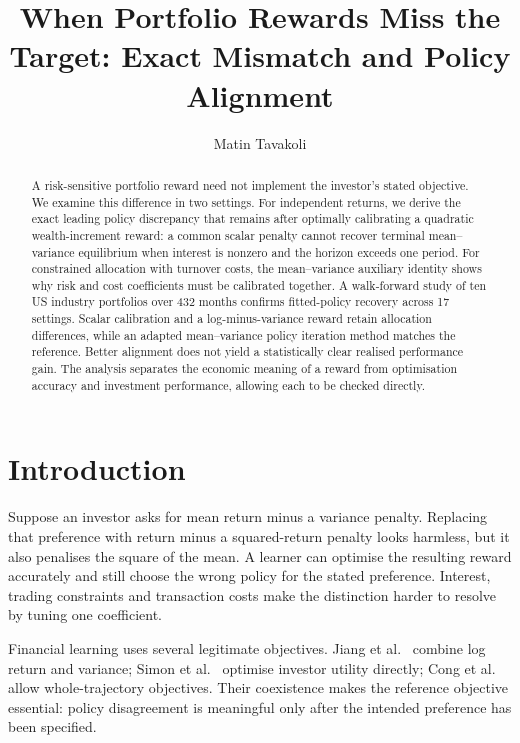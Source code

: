 \documentclass[sigconf,review]{acmart}
\title{When Portfolio Rewards Miss the Target: Exact Mismatch and Policy Alignment}
\author{Matin Tavakoli}
\begin{document}
\begin{abstract}
A risk-sensitive portfolio reward need not implement the investor's stated objective. We examine this difference in two settings. For independent returns, we derive the exact leading policy discrepancy that remains after optimally calibrating a quadratic wealth-increment reward: a common scalar penalty cannot recover terminal mean--variance equilibrium when interest is nonzero and the horizon exceeds one period. For constrained allocation with turnover costs, the mean--variance auxiliary identity shows why risk and cost coefficients must be calibrated together. A walk-forward study of ten US industry portfolios over 432 months confirms fitted-policy recovery across 17 settings. Scalar calibration and a log-minus-variance reward retain allocation differences, while an adapted mean--variance policy iteration method matches the reference. Better alignment does not yield a statistically clear realised performance gain. The analysis separates the economic meaning of a reward from optimisation accuracy and investment performance, allowing each to be checked directly.
\end{abstract}
\maketitle

\section{Introduction}
Suppose an investor asks for mean return minus a variance penalty. Replacing that preference with return minus a squared-return penalty looks harmless, but it also penalises the square of the mean. A learner can optimise the resulting reward accurately and still choose the wrong policy for the stated preference. Interest, trading constraints and transaction costs make the distinction harder to resolve by tuning one coefficient.

Financial learning uses several legitimate objectives. Jiang et al.\ \cite{jiang2025} combine log return and variance; Simon et al.\ \cite{simon2026} optimise investor utility directly; Cong et al.\ \cite{cong2026} allow whole-trajectory objectives. Their coexistence makes the reference objective essential: policy disagreement is meaningful only after the intended preference has been specified.
\end{document}
